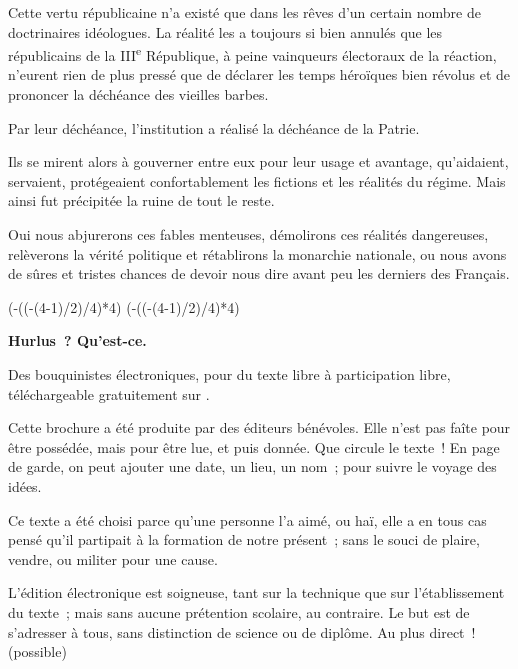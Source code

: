 \documentclass[french,twoside]{book} %
\newcommand\chapterclose{} %
\def\truncdiv#1#2{((#1-(#2-1)/2)/#2)}
\def\moduloop#1#2{(#1-\truncdiv{#1}{#2}*#2)}
\def\modulo#1#2{\number\numexpr\moduloop{#1}{#2}\relax}
\begin{document}
Cette vertu républicaine n’a existé que dans les rêves d’un certain nombre de doctrinaires idéologues. La réalité les a toujours si bien annulés que les républicains de la III\textsuperscript{e} République, à peine vainqueurs électoraux de la réaction, n’eurent rien de plus pressé que de déclarer les temps héroïques bien révolus et de prononcer la déchéance des vieilles barbes.\par
Par leur déchéance, l’institution a réalisé la déchéance de la Patrie.\par
Ils se mirent alors à gouverner entre eux pour leur usage et avantage, qu’aidaient, servaient, protégeaient confortablement les fictions et les réalités du régime. Mais ainsi fut précipitée la ruine de tout le reste.\par
Oui nous abjurerons ces fables menteuses, démolirons ces réalités dangereuses, relèverons la vérité politique et rétablirons la monarchie nationale, ou nous avons de sûres et tristes chances de devoir nous dire avant peu les derniers des Français.
\chapterclose

 


\ifbooklet
  \pagestyle{empty}
  \clearpage
  \ifnum\modulo{\value{page}}{4}=0 \hbox{}\newpage\hbox{}\newpage\fi
  \ifnum\modulo{\value{page}}{4}=1 \hbox{}\newpage\hbox{}\newpage\fi


  \hbox{}\newpage
  \ifodd\value{page}\hbox{}\newpage\fi
  {\centering\color{rubric}\bfseries\noindent\large
    Hurlus ? Qu’est-ce.\par
    \bigskip
  }
  \noindent Des bouquinistes électroniques, pour du texte libre à participation libre,
  téléchargeable gratuitement sur \href{https://hurlus.fr}{}.\par
  \bigskip
  \noindent Cette brochure a été produite par des éditeurs bénévoles.
  Elle n’est pas faîte pour être possédée, mais pour être lue, et puis donnée.
  Que circule le texte !
  En page de garde, on peut ajouter une date, un lieu, un nom ; pour suivre le voyage des idées.
  \par

  Ce texte a été choisi parce qu’une personne l’a aimé,
  ou haï, elle a en tous cas pensé qu’il partipait à la formation de notre présent ;
  sans le souci de plaire, vendre, ou militer pour une cause.
  \par

  L’édition électronique est soigneuse, tant sur la technique
  que sur l’établissement du texte ; mais sans aucune prétention scolaire, au contraire.
  Le but est de s’adresser à tous, sans distinction de science ou de diplôme.
  Au plus direct ! (possible)
  \par
\end{document}
